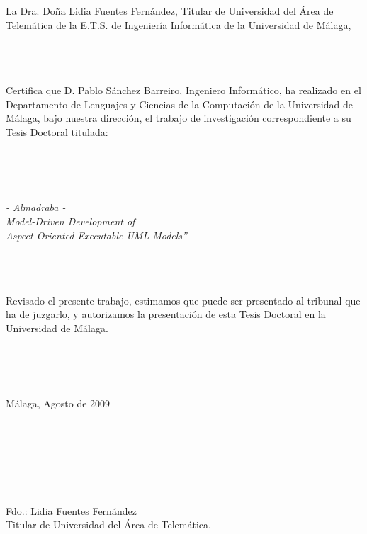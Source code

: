 
\ \\ \ \\

La Dra. Do{\~n}a Lidia Fuentes Fern{\'a}ndez, Titular de Universidad del {\'A}rea de Telem{\'a}tica de
la E.T.S. de Ingenier{\'i}a Inform{\'a}tica de la Universidad de M{\'a}laga,

\ \\ \ \\ \ \\

Certifica que D. Pablo S{\'a}nchez Barreiro, Ingeniero Inform{\'a}tico, ha realizado en el Departamento
de Lenguajes y Ciencias de la Computaci{\'o}n de la Universidad de M{\'a}laga, bajo nuestra direcci{\'o}n, el trabajo de investigaci{\'o}n correspondiente a su Tesis Doctoral titulada:

\ \\ \ \\ \ \\

\begin{center}
\emph{- Almadraba - \\ Model-Driven Development of \\Aspect-Oriented Executable UML Models''}
\end{center}

\ \\ \ \\ \ \\

Revisado el presente trabajo, estimamos que puede ser presentado al tribunal que ha de juzgarlo, y autorizamos la presentaci{\'o}n de esta Tesis Doctoral en la Universidad de M{\'a}laga.

\ \\ \ \\ \ \\

\begin{flushright}
M{\'a}laga, Agosto de 2009
\end{flushright}

\begin{center}
\ \\ \ \\ \ \\ \ \\ \ \\ \ \\
Fdo.: Lidia Fuentes Fern{\'a}ndez \\
Titular de Universidad del {\'A}rea de Telem{\'a}tica.
\end{center}

\thispagestyle{empty} \

